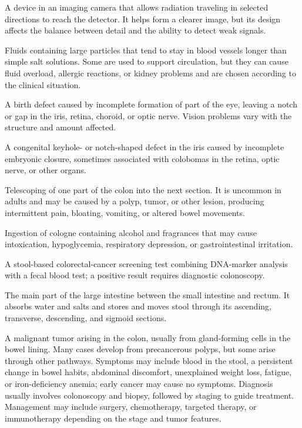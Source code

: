  A device in an imaging camera that allows radiation traveling in selected directions to reach the detector. It helps form a clearer image, but its design affects the balance between detail and the ability to detect weak signals.

 Fluids containing large particles that tend to stay in blood vessels longer than simple salt solutions. Some are used to support circulation, but they can cause fluid overload, allergic reactions, or kidney problems and are chosen according to the clinical situation.

 A birth defect caused by incomplete formation of part of the eye, leaving a notch or gap in the iris, retina, choroid, or optic nerve. Vision problems vary with the structure and amount affected.

 A congenital keyhole- or notch-shaped defect in the iris caused by incomplete embryonic closure, sometimes associated with colobomas in the retina, optic nerve, or other organs.

 Telescoping of one part of the colon into the next section. It is uncommon in adults and may be caused by a polyp, tumor, or other lesion, producing intermittent pain, bloating, vomiting, or altered bowel movements.

 Ingestion of cologne containing alcohol and fragrances that may cause intoxication, hypoglycemia, respiratory depression, or gastrointestinal irritation.

 A stool-based colorectal-cancer screening test combining DNA-marker analysis with a fecal blood test; a positive result requires diagnostic colonoscopy.

 The main part of the large intestine between the small intestine and rectum. It absorbs water and salts and stores and moves stool through its ascending, transverse, descending, and sigmoid sections.

 A malignant tumor arising in the colon, usually from gland-forming cells in the bowel lining. Many cases develop from precancerous polyps, but some arise through other pathways. Symptoms may include blood in the stool, a persistent change in bowel habits, abdominal discomfort, unexplained weight loss, fatigue, or iron-deficiency anemia; early cancer may cause no symptoms. Diagnosis usually involves colonoscopy and biopsy, followed by staging to guide treatment. Management may include surgery, chemotherapy, targeted therapy, or immunotherapy depending on the stage and tumor features.

